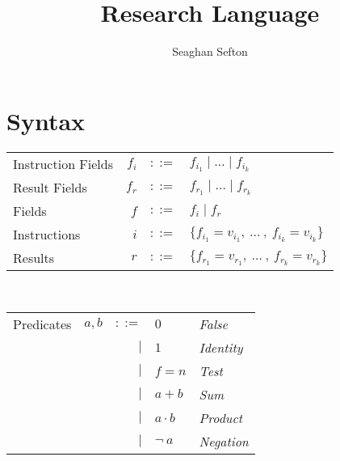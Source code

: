 \documentclass[12pt, letterpaper]{article}
\title{Research Language}
\author{Seaghan Sefton}
\begin{document}
\section{Syntax}

    \begin{tabular}{l r c l}
        Instruction Fields   & $f_{i}$   & $::=$     & $f_{i_{1}} \mid \dots \mid f_{i_{k}}$\\
        Result Fields   & $f_{r}$   & $::=$     & $f_{r_{1}} \mid \dots \mid f_{r_{k}}$\\
        Fields          & $f$       & $::=$     & $f_i \mid f_r$ \\
        Instructions         & $i$       & $::=$     & $\{f_{i_{1}} = v_{i_{1}} ,\ \dots\ ,\ f_{i_{k}} = v_{i_{k}}\}$\\
        Results         & $r$       & $::=$     & $\{f_{r_{1}} = v_{r_{1}} ,\ \dots\ ,\ f_{r_{k}} = v_{r_{k}}\}$\\
    \end{tabular}\\

    \begin{tabular}{l c r l l}
        Predicates  & $a,b$     & $::=$  & $0$          & \textit{False} \\
                    &           & $\mid$ & $1$          & \textit{Identity}    \\
                    &           & $\mid$ & $f=n$        & \textit{Test} \\  
                    &           & $\mid$ & $a + b$      & \textit{Sum}      \\
                    &           & $\mid$ & $a \cdot b$  & \textit{Product}  \\
                    &           & $\mid$ & $\neg \ a$   & \textit{Negation}
    \end{tabular}\\
\end{document}
